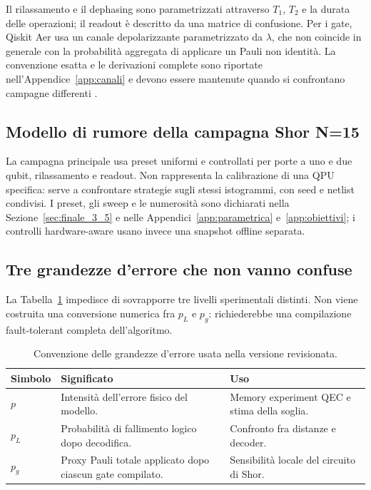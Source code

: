 Il rilassamento e il dephasing sono parametrizzati attraverso $T_1$, $T_2$ e la durata delle operazioni; il readout è descritto da una matrice di confusione. Per i gate, Qiskit Aer usa un canale depolarizzante parametrizzato da $\lambda$, che non coincide in generale con la probabilità aggregata di applicare un Pauli non identità. La convenzione esatta e le derivazioni complete sono riportate nell'Appendice~\ref{app:canali} e devono essere mantenute quando si confrontano campagne differenti \cite{qiskit2023,nielsenChuang2000}.

\subsection{Modello di rumore della campagna Shor N=15}\label{sec:finale_3_3_3}

La campagna principale usa preset uniformi e controllati per porte a uno e due qubit, rilassamento e readout. Non rappresenta la calibrazione di una QPU specifica: serve a confrontare strategie sugli stessi istogrammi, con seed e netlist condivisi. I preset, gli sweep e le numerosità sono dichiarati nella Sezione~\ref{sec:finale_3_5} e nelle Appendici~\ref{app:parametrica} e~\ref{app:obiettivi}; i controlli hardware-aware usano invece una snapshot offline separata.

\subsection{Tre grandezze d'errore che non vanno confuse}\label{sec:finale_3_3_4}

La Tabella~\ref{tab:finale_3_3} impedisce di sovrapporre tre livelli sperimentali distinti. Non viene costruita una conversione numerica fra $p_L$ e $p_g$: richiederebbe una compilazione fault-tolerant completa dell'algoritmo.

\begin{table}[!htbp]
\centering
\small
\caption{Convenzione delle grandezze d'errore usata nella versione revisionata.}\label{tab:finale_3_3}
\begin{tabularx}{\textwidth}{@{}lXX@{}}
\toprule
\textbf{Simbolo} & \textbf{Significato} & \textbf{Uso} \\
\midrule
$p$ & Intensità dell'errore fisico del modello. & Memory experiment QEC e stima della soglia. \\
$p_L$ & Probabilità di fallimento logico dopo decodifica. & Confronto fra distanze e decoder. \\
$p_g$ & Proxy Pauli totale applicato dopo ciascun gate compilato. & Sensibilità locale del circuito di Shor. \\
\bottomrule
\end{tabularx}
\end{table}

